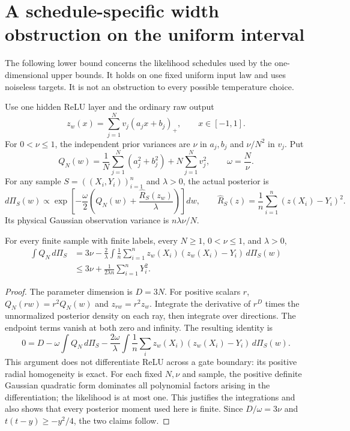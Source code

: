 \section{A schedule-specific width obstruction on the uniform interval}
\label{sec:univariate-schedule-sharpness}

The following lower bound concerns the likelihood schedules used by the
one-dimensional upper bounds. It holds on one fixed uniform input law
and uses noiseless targets. It is not an obstruction to every possible
temperature choice.

Use one hidden ReLU layer and the ordinary raw output
\[
 z_w(x)=\sum_{j=1}^N v_j(a_jx+b_j)_+,
 \qquad x\in[-1,1].
\]
For $0<\nu\le1$, the independent prior variances are $\nu$ in
$a_j,b_j$ and $\nu/N^2$ in $v_j$. Put
\[
 Q_N(w)=\frac1N\sum_{j=1}^N(a_j^2+b_j^2)
                   +N\sum_{j=1}^Nv_j^2,
 \qquad \omega=\frac N\nu.
\]
For any sample $S=((X_i,Y_i))_{i=1}^n$ and $\lambda>0$, the actual
posterior is
\begin{equation}\label{eq:univariate-sharpness-posterior}
 d\Pi_S(w)\propto
 \exp\!\left[-\frac\omega2
       \left(Q_N(w)+\frac{\widehat R_S(z_w)}\lambda\right)\right]dw,
 \qquad
 \widehat R_S(z)=\frac1n\sum_{i=1}^n(z(X_i)-Y_i)^2.
\end{equation}
Its physical Gaussian observation variance is $n\lambda\nu/N$.

\begin{lemma}
\label{lem:univariate-posterior-energy}
For every finite sample with finite labels, every $N\ge1$,
$0<\nu\le1$, and $\lambda>0$,
\begin{align}
 \int Q_N\,d\Pi_S
 &=3\nu-\frac2\lambda\int
     \frac1n\sum_{i=1}^n z_w(X_i)(z_w(X_i)-Y_i)\,d\Pi_S(w)
       \label{eq:univariate-energy-identity}\\
 &\le 3\nu+\frac{1}{2\lambda n}\sum_{i=1}^nY_i^2.
       \label{eq:univariate-energy-bound}
\end{align}
\end{lemma}
\begin{proof}
The parameter dimension is $D=3N$. For positive scalars $r$,
$Q_N(rw)=r^2Q_N(w)$ and $z_{rw}=r^2z_w$.
Integrate the derivative of $r^D$ times the unnormalized posterior
density on each ray, then integrate over directions. The endpoint
terms vanish at both zero and infinity. The resulting identity is
\[
 0=D-\omega\int Q_N\,d\Pi_S
   -\frac{2\omega}{\lambda}\int
        \frac1n\sum_i z_w(X_i)(z_w(X_i)-Y_i)\,d\Pi_S(w).
\]
This argument does not differentiate ReLU across a gate boundary:
its positive radial homogeneity is exact. For each fixed $N,\nu$
and sample, the positive definite Gaussian quadratic form dominates
all polynomial factors arising in the differentiation; the
likelihood is at most one. This justifies the integrations and also
shows that every posterior moment used here is finite. Since
$D/\omega=3\nu$ and $t(t-y)\ge-y^2/4$, the two claims follow.
\end{proof}


